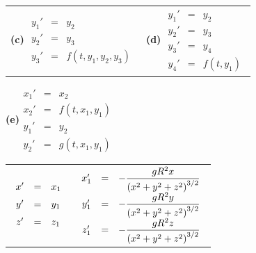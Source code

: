 \begin{tabular}[t]{@{}p{168pt}@{}p{168pt}}
\quad\;   {\bf (c)} $\begin{array}{ccl}
y_{1}'&=&y_{2}\\y_{2}'&=&y_{3}\\y_{3}'&=&f(t,y_{1},y_{2},y_{3})
\end{array}$&
\quad \,{\bf (d)} $\begin{array}{ccl}
y_{1}'&=&y_{2}\\y_{2}'&=&y_{3}\\y_{3}'&=&y_{4}\\y_{4}'&=&f(t,y_{1})
\end{array}$
\end{tabular}

\quad\;
{\bf (e)}$ \begin{array}{ccl}x_{1}'&=&x_{2}\\x_{2}'&=&f(t,x_{1},y_{1})\\
y_{1}'&=&y_{2}\\y_{2}'&=&g(t,x_{1},y_{1})\end{array}$

\begin{tabular}[t]{@{}p{168pt}@{}p{168pt}}
$\begin{array}{ccl}x'&=&x_{1}\\[2\jot]y'&=&y_{1}\\[2\jot]z'&=&z_{1}\end{array}$&
$\displaystyle{
\begin{array}{ccl}
 x_{1}'&=&-\displaystyle\frac{gR^{2}x}{\left(x^{2}+y^{2}+z^{2}\right)^{3/2}}\\[2\jot]
 y_{1}'&=&-\displaystyle\frac{gR^{2}y}{\left(x^{2}+y^{2}+z^{2}\right)^{3/2}}\\[2\jot]
 z_{1}'&=&-\displaystyle\frac{gR^{2}z}{\left(x^{2}+y^{2}+z^{2}\right)^{3/2}}
\end{array}}$
\end{tabular}


